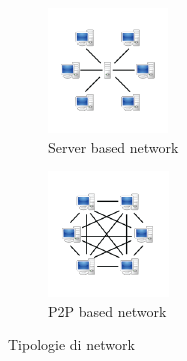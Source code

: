 \documentclass[11pt]{thesistemp}
\begin{document}
\begin{figure}[h]
    \centering
    \begin{subfigure}[h]{0.3\textwidth}
        \includegraphics[width=\textwidth]{server-based-net.png}
        \caption{Server based network}
        \label{fig:server-based-net}
    \end{subfigure}\qquad
    \begin{subfigure}[h]{0.3\textwidth}
        \includegraphics[width=\textwidth]{p2p-based-net.png}
        \caption{P2P based network}
        \label{fig:p2p-based-net}
    \end{subfigure}
    \caption{Tipologie di network}
    \label{fig:net}
\end{figure}\\\\
\end{document}
